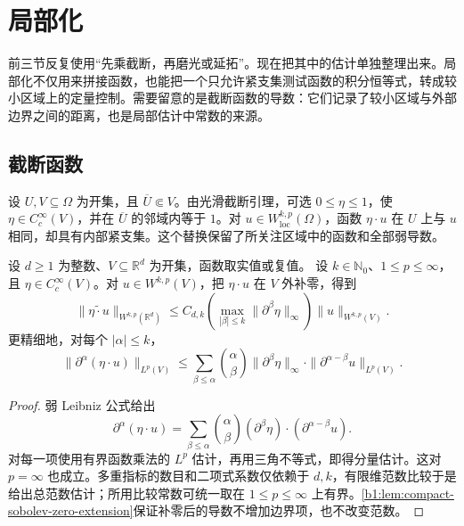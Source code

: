 \section{局部化}
\label{b1:sec:2204}

前三节反复使用“先乘截断，再磨光或延拓”。现在把其中的估计单独整理出来。局部化不仅用来拼接函数，也能把一个只允许紧支集测试函数的积分恒等式，转成较小区域上的定量控制。需要留意的是截断函数的导数：它们记录了较小区域与外部边界之间的距离，也是局部估计中常数的来源。

\subsection{截断函数}
\label{b1:subsec:220401}

设 \(U,V\subseteq\Omega\) 为开集，且 \(\overline U\Subset V\)。由光滑截断引理，可选 \(0\le\eta\le1\)，使 \(\eta\in C_c^\infty(V)\)，并在 \(\overline U\) 的邻域内等于 \(1\)。对 \(u\in W^{k,p}_{\mathrm{loc}}(\Omega)\)，函数 \(\eta\cdot u\) 在 \(U\) 上与 \(u\) 相同，却具有内部紧支集。这个替换保留了所关注区域中的函数和全部弱导数。

\begin{proposition}\label{b1:prop:sobolev-cutoff-estimate}
设 \(d\geq1\) 为整数、\(V\subseteq\mathbb R^d\) 为开集，函数取实值或复值。
设 \(k\in\mathbb N_0\)、\(1\le p\le\infty\)，且 \(\eta\in C_c^\infty(V)\)。对 \(u\in W^{k,p}(V)\)，把 \(\eta\cdot u\) 在 \(V\) 外补零，得到
\[
 \|\widetilde{\eta\cdot u}\|_{W^{k,p}(\mathbb R^d)}
 \le C_{d,k}
 \left(\max_{|\beta|\le k}\|\partial^\beta\eta\|_\infty\right)
 \|u\|_{W^{k,p}(V)}.
\]
更精细地，对每个 \(|\alpha|\le k\)，
\begin{equation}\label{b1:eq:sobolev-cutoff-components}
 \|\partial^\alpha(\eta\cdot u)\|_{L^p(V)}
 \le\sum_{\beta\le\alpha}\binom\alpha\beta
     \|\partial^\beta\eta\|_\infty
     \cdot\|\partial^{\alpha-\beta}u\|_{L^p(V)}.
\end{equation}
\end{proposition}
\begin{proof}
弱 Leibniz 公式给出
\[
 \partial^\alpha(\eta\cdot u)
 =\sum_{\beta\le\alpha}\binom\alpha\beta
       (\partial^\beta\eta)\cdot(\partial^{\alpha-\beta}u).
\]
对每一项使用有界函数乘法的 \(L^p\) 估计，再用三角不等式，即得分量估计。这对 \(p=\infty\) 也成立。多重指标的数目和二项式系数仅依赖于 \(d,k\)，有限维范数比较于是给出总范数估计；所用比较常数可统一取在 \(1\le p\le\infty\) 上有界。\cref{b1:lem:compact-sobolev-zero-extension}保证补零后的导数不增加边界项，也不改变范数。
\end{proof}

